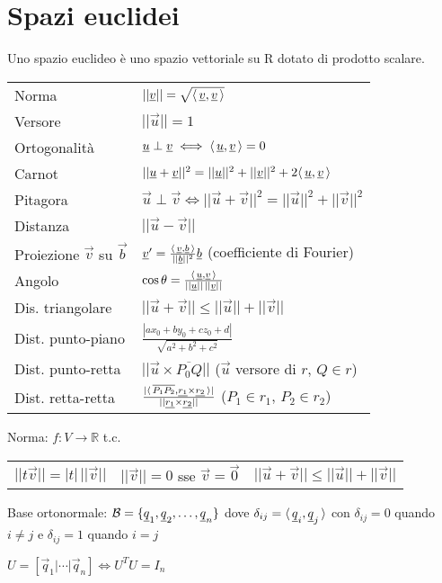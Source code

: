 \section{Spazi euclidei}

Uno spazio euclideo è uno spazio vettoriale su R dotato di prodotto scalare.

\begin{tabular}{ll}
	Norma & $||\underline{v}|| = \sqrt{\langle\,\underline{v},\underline{v}\,\rangle}$ \\
	Versore & $||\vec{u}|| = 1$ \\
	Ortogonalità & $\underline{u} \perp \underline{v} \iff \langle\,\underline{u},\underline{v}\,\rangle = 0$ \\
	Carnot & $||\underline{u}+\underline{v}||^2 = ||\underline{u}||^2+||\underline{v}||^2+2\langle\,\underline{u},\underline{v}\,\rangle$ \\
	Pitagora & $\vec{u} \perp \vec{v} \iff ||\vec{u}+\vec{v}||^2 = ||\vec{u}||^2+||\vec{v}||^2$ \\
	Distanza & $||\vec{u}-\vec{v}||$ \\
	Proiezione $\vec{v}$ su $\vec{b}$ & $\underline{v}' = \frac{\langle\,\underline{v},\underline{b}\,\rangle}{||\underline{b}||^2}\underline{b}$ (coefficiente di Fourier) \\
	Angolo & $\cos \theta = \frac{\langle\,\underline{u},\underline{v}\,\rangle}{||\underline{u}||\,||\underline{v}||}$ \\
	Dis. triangolare & $||\vec{u}+\vec{v}|| \le ||\vec{u}||+||\vec{v}||$ \\
	Dist. punto-piano & $\frac{|ax_0 + by_0 + cz_0 + d|}{\sqrt{a^2 + b^2 + c^2}}$ \\
	Dist. punto-retta & $||\vec{u} \times \overline{P_0Q}||$ ($\vec{u}$ versore di $r$, $Q \in r$) \\
	Dist. retta-retta & $\frac{|\langle\,\overline{P_1P_2},\underline{r_1} \times \underline{r_2}\,\rangle|}{||\underline{r_1} \times \underline{r_2}||}$ ($P_1 \in r_1$, $P_2 \in r_2$)
\end{tabular}

Norma: $f: V \rightarrow \mathbb{R}$ t.c.
\begin{tabular}{lll}
	$||t\vec{v}|| = |t|\,||\vec{v}||$ &
	$||\vec{v}|| = 0$ sse $\vec{v} = \vec{0}$ &
	$||\vec{u}+\vec{v}|| \le ||\vec{u}||+||\vec{v}||$
\end{tabular}

Base ortonormale: $\mathcal{B} = \{\underline{q}_1, \underline{q}_2, \dots, \underline{q}_n\}$ dove $\delta_{ij} = \langle\,\underline{q}_i,\underline{q}_j\,\rangle$ con $\delta_{ij} = 0$ quando $i \ne j$ e $\delta_{ij} = 1$ quando $i = j$

$U = [\vec{q}_1 | \cdots | \vec{q}_n] \iff U^TU=I_n$
